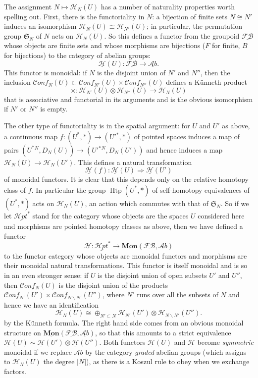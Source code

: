 \documentclass[12pt,letterpaper]{amsart}
\numberwithin{equation}{section}
\def\ssm{\smallsetminus}
\def\Hcal{{\mathcal H}}
\def\uHcal{{\underline\Hcal}}
\newcommand\FB{\underline{\mathcal {F\!B}}}
\newcommand \Zmod{\underline{\mathcal A b}}
\def\Sfrak{\mathfrak{S}}
\newcommand\conf{\mathscr{C}\!\mathit{onf}\!}
\newcommand\Htp{\operatorname{Htp}}
\theoremstyle{remark}
\begin{document}
The assignment $N\mapsto\Hcal_N(U)$  has  a number of naturality  properties worth spelling out.  First, there is the functoriality in $N$:
a bijection of finite sets $N\cong N'$ induces an isomorphism $\Hcal_N(U)\cong \Hcal_{N'}(U)$; in particular, the permutation group $\Sfrak_N$ of $N$ acts on $\Hcal_N(U)$.   So this defines a functor from the groupoid 
$\FB$ whose objects are finite sets and whose morphisms are bijections  ($F$ for finite, $B$ for bijections) to the category of abelian groups:
 \[
\uHcal(U):  \FB\to \Zmod.
\]
This functor is monoidal:  if $N$ is the disjoint union of $N'$ and $N''$, then 
the inclusion  $\conf_{N}(U)\subset \conf_{N'}(U)\times \conf_{N''}(U)$ defines a K\"unneth  product 
\begin{equation*}
\times: \Hcal_{N'}(U)\otimes \Hcal_{N''}(U)\to \Hcal_N(U)
\end{equation*}
 that   is associative and functorial in its arguments and  is the obvious isomorphism  if $N'$ or $N''$ is empty.  

 
 The other type of functoriality is in the spatial argument:  for $U$ and $U'$ as above, a   continuous map $f:(U^*,*)\to (U'{}^*,*)$  of pointed spaces  induces a  map of pairs $(U^*{}^N, D_N(U))\to (U'{}^*{}^N, D_N(U'))$ and hence induces a map $\Hcal_N(U)\to \Hcal_N(U')$. This defines a natural transformation 
  \[
 \uHcal (f): \uHcal(U)\Rightarrow \uHcal(U')
  \]
of monoidal functors. It is clear that  this depends only on the relative  homotopy class of $f$. In particular the group 
 $\Htp(U^*,*)$ of self-homotopy equivalences of $(U^*,*)$ acts on $\Hcal_N(U)$, an  action which commutes with that of $\Sfrak_N$. 
So if we let $\underline{\Hcal\! pt}^*$  stand for the category  whose objects are the  spaces $U$ considered here and  morphisms are pointed homotopy classes as above, then we have defined 
a   functor 
\begin{equation}\label{eqn:2functor}
\uHcal :\underline{\Hcal\! pt}^*\to  \underline{\mathbf{Mon}}(\FB, \Zmod)
\end{equation}
 to the  functor category whose objects are monoidal functors and morphisms are their monoidal natural transformations. This functor   is itself   monoidal and is so in an even stronger sense:  if $U$ is the disjoint union of open subsets $U'$ and $U''$, then 
 $\conf_N(U)$ is the disjoint union of the products  $\conf_{N'}(U')\times \conf_{N\ssm N'}(U'')$, where $N'$ runs over all the subsets of $N$ and hence we have an identification
 \begin{equation}\label{eqn:spatial-lmonoidal}
 \Hcal_N(U)\cong \oplus_{N'\subset N} \Hcal_{N'}(U')\otimes \Hcal_{N\ssm N'}(U'').
\end{equation}
by  the K\"unneth formula. 
The right hand side  comes from an obvious monoidal structure on  $\underline{\mathbf{Mon}}(\FB, \Zmod)$, so that this amounts to  a strict equivalence 
$ \uHcal(U)\sim\uHcal(U')\otimes \uHcal(U'')$. 
Both functors  $\uHcal(U)$ and $\uHcal$  become \emph{symmetric} monoidal if  we replace  $\Zmod$ by the category  \emph{graded} abelian groups (which assigns to $\Hcal_N(U)$ the degree $|N|$), as there is a Koszul rule to obey when we exchange factors.
\end{document}
